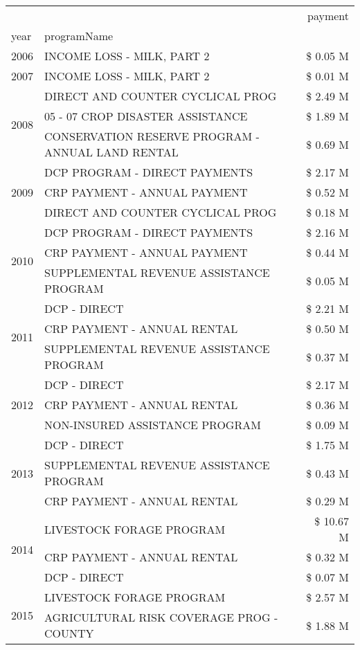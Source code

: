 \begin{tabular}{llr}
\toprule
 &  & payment \\
year & programName &  \\
\midrule
2006 & INCOME LOSS - MILK, PART 2 & \$ 0.05 M \\
\cline{1-3}
2007 & INCOME LOSS - MILK, PART 2 & \$ 0.01 M \\
\cline{1-3}
\multirow[t]{3}{*}{2008} & DIRECT AND COUNTER CYCLICAL PROG & \$ 2.49 M \\
 & 05 - 07 CROP DISASTER ASSISTANCE & \$ 1.89 M \\
 & CONSERVATION RESERVE PROGRAM - ANNUAL LAND RENTAL & \$ 0.69 M \\
\cline{1-3}
\multirow[t]{3}{*}{2009} & DCP PROGRAM - DIRECT PAYMENTS & \$ 2.17 M \\
 & CRP PAYMENT - ANNUAL PAYMENT & \$ 0.52 M \\
 & DIRECT AND COUNTER CYCLICAL PROG & \$ 0.18 M \\
\cline{1-3}
\multirow[t]{3}{*}{2010} & DCP PROGRAM - DIRECT PAYMENTS & \$ 2.16 M \\
 & CRP PAYMENT - ANNUAL PAYMENT & \$ 0.44 M \\
 & SUPPLEMENTAL REVENUE ASSISTANCE PROGRAM & \$ 0.05 M \\
\cline{1-3}
\multirow[t]{3}{*}{2011} & DCP - DIRECT & \$ 2.21 M \\
 & CRP PAYMENT - ANNUAL RENTAL & \$ 0.50 M \\
 & SUPPLEMENTAL REVENUE ASSISTANCE PROGRAM & \$ 0.37 M \\
\cline{1-3}
\multirow[t]{3}{*}{2012} & DCP - DIRECT & \$ 2.17 M \\
 & CRP PAYMENT - ANNUAL RENTAL & \$ 0.36 M \\
 & NON-INSURED ASSISTANCE PROGRAM & \$ 0.09 M \\
\cline{1-3}
\multirow[t]{3}{*}{2013} & DCP - DIRECT & \$ 1.75 M \\
 & SUPPLEMENTAL REVENUE ASSISTANCE PROGRAM & \$ 0.43 M \\
 & CRP PAYMENT - ANNUAL RENTAL & \$ 0.29 M \\
\cline{1-3}
\multirow[t]{3}{*}{2014} & LIVESTOCK FORAGE PROGRAM & \$ 10.67 M \\
 & CRP PAYMENT - ANNUAL RENTAL & \$ 0.32 M \\
 & DCP - DIRECT & \$ 0.07 M \\
\cline{1-3}
\multirow[t]{3}{*}{2015} & LIVESTOCK FORAGE PROGRAM & \$ 2.57 M \\
 & AGRICULTURAL RISK COVERAGE PROG - COUNTY & \$ 1.88 M \\

\end{tabular}
